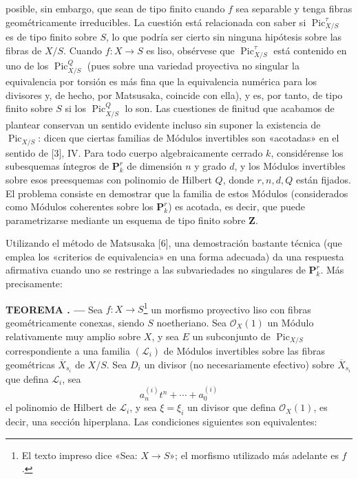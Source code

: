 \documentclass[11pt,twoside,openany]{book}
\numberwithin{equation}{section}
\newcommand{\src}[1]{%
  \phantomsection\hypertarget{src:#1}{}%
  \marginpar{\raggedleft\footnotesize\sffamily #1}%
}
\theoremstyle{plain}
\theoremstyle{definition}
\theoremstyle{remark}
\newcommand{\result}[2]{%
  \par\medskip\noindent\textbf{#1%
  \if\relax\detokenize{#2}\relax\else\space#2\fi. ---}\enspace
}
\newcommand{\FgaUnitKey}{frontmatter}
\renewcommand{\src}[1]{%
  \phantomsection\hypertarget{src:\FgaUnitKey:#1}{}%
  \marginpar{\raggedleft\footnotesize\sffamily #1}%
}
\theoremstyle{plain}
\theoremstyle{definition}
\theoremstyle{remark}
\begin{document}
\src{242}
posible, sin embargo, que sean de tipo finito cuando $f$ sea separable y tenga
fibras geométricamente irreducibles. La cuestión está relacionada con saber si
$\operatorname{Pic}_{X/S}^\tau$ es de tipo finito sobre $S$, lo que podría ser
cierto sin ninguna hipótesis sobre las fibras de $X/S$. Cuando
$f:X\longrightarrow S$ es liso, obsérvese que
$\operatorname{Pic}_{X/S}^\tau$ está contenido en uno de los
$\operatorname{Pic}_{X/S}^Q$ (pues sobre una variedad proyectiva no singular la
equivalencia por torsión es más fina que la equivalencia numérica para los
divisores y, de hecho, por Matsusaka, coincide con ella), y es, por tanto, de
tipo finito sobre $S$ si los $\operatorname{Pic}_{X/S}^Q$ lo son. Las
cuestiones de finitud que acabamos de plantear conservan un sentido evidente
incluso sin suponer la existencia de $\operatorname{Pic}_{X/S}$: dicen que
ciertas familias de Módulos invertibles son «acotadas» en el sentido de [3], IV.
Para todo cuerpo algebraicamente cerrado $k$, considérense los subesquemas
íntegros de $\mathbf P_k^r$ de dimensión $n$ y grado $d$, y los Módulos
invertibles sobre esos preesquemas con polinomio de Hilbert $Q$, donde
$r,n,d,Q$ están fijados. El problema consiste en demostrar que la familia de
estos Módulos (considerados como Módulos coherentes sobre los $\mathbf P_k^r$) es
acotada, es decir, que puede parametrizarse mediante un esquema de tipo finito
sobre $\mathbf Z$.

Utilizando el método de Matsusaka [6], una demostración bastante técnica (que
emplea los «criterios de equivalencia» en una forma adecuada) da una respuesta
afirmativa cuando uno se restringe a las subvariedades no singulares de
$\mathbf P_k^r$. Más precisamente:

\result{TEOREMA}{4.1} Sea $f:X\longrightarrow S$\footnote{El texto impreso
dice «Sea: $X\longrightarrow S$»; el morfismo utilizado más adelante es $f$.}
un morfismo proyectivo liso con fibras geométricamente conexas, siendo $S$
noetheriano. Sea $\mathcal O_X(1)$ un Módulo relativamente muy amplio sobre $X$,
y sea $E$ un subconjunto de $\operatorname{Pic}_{X/S}$ correspondiente a una
familia $(\mathcal L_i)$ de Módulos invertibles sobre las fibras geométricas
$\overline X_{s_i}$ de $X/S$. Sea $D_i$ un divisor (no necesariamente
efectivo) sobre $\overline X_{s_i}$ que defina $\mathcal L_i$, sea
\[
a_n^{(i)}t^n+\cdots+a_0^{(i)}
\]
el polinomio de Hilbert de $\mathcal L_i$, y sea $\xi=\xi_i$ un divisor que
defina $\mathcal O_X(1)$, es decir, una sección hiperplana. Las condiciones
siguientes son equivalentes:
\end{document}
